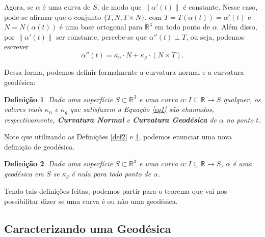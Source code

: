 \documentclass{article}
\newtheorem{definition}{Definição}
\begin{document}
Agora, se $\alpha$ é uma curva de $S$, de modo que $\|\alpha'(t)\|$ é constante. Nesse caso, pode-se afirmar que o conjunto $\{T, N, T\times N\}$, com $T = T(\alpha(t)) = \alpha'(t)$ e $N = N(\alpha(t))$ é uma base ortogonal para $\mathbb{R}^3$ em todo ponto de $\alpha$. Além disso, por $\|\alpha'(t)\|$ ser constante, percebe-se que $\alpha''(t)\perp T$, ou seja, podemos escrever
\begin{equation}
    \label{eq1}
    \alpha''(t) = \kappa_n\cdot N + \kappa_g\cdot (N\times T).
\end{equation}

Dessa forma, podemos definir formalmente a curvatura normal e a curvatura geodésica:
\begin{definition}
    \label{def3}
    Dada uma superfície $S\subset \mathbb{R}^3$ e uma curva $\alpha : I\subseteq\mathbb{R}\to S$ qualquer, os valores reais $\kappa_n$ e $\kappa_g$ que satisfazem a Equação \ref{eq1} são chamados, respectivamente, \textbf{Curvatura Normal} e \textbf{Curvatura Geodésica} de $\alpha$ no ponto $t$.
\end{definition}

Note que utilizando as Definições \ref{def2} e \ref{def3}, podemos enunciar uma nova definição de geodésica.
\begin{definition}
    \label{def4}
    Dada uma superfície $S\subset \mathbb{R}^3$ e uma curva $\alpha : I\subseteq\mathbb{R}\to S$, $\alpha$ é uma geodésica em $S$ se $\kappa_g$ é nula para todo ponto de $\alpha$.
\end{definition}

Tendo tais definições feitas, podemos partir para o teorema que vai nos possibilitar dizer se uma curva é ou não uma geodésica.

\subsection{Caracterizando uma Geodésica}
\end{document}
